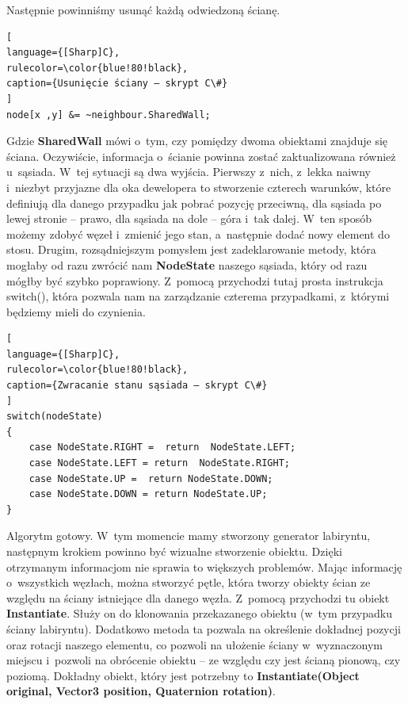 \documentclass[oneside,polski,logo]{amuthesis}
\begin{document}
Następnie powinniśmy usunąć każdą odwiedzoną ścianę.

\begin{lstlisting}[
language={[Sharp]C},
rulecolor=\color{blue!80!black},
caption={Usunięcie ściany – skrypt C\#}
]
node[x ,y] &= ~neighbour.SharedWall;
\end{lstlisting}

Gdzie \textbf{SharedWall} mówi o~tym, czy pomiędzy dwoma obiektami znajduje się ściana. Oczywiście, informacja o~ścianie powinna zostać zaktualizowana również u~sąsiada. W~tej sytuacji są dwa wyjścia. Pierwszy z~nich, z~lekka naiwny i~niezbyt przyjazne dla oka dewelopera to stworzenie czterech warunków, które definiują dla danego przypadku jak pobrać pozycję przeciwną, dla sąsiada po lewej stronie – prawo, dla sąsiada na dole – góra i~tak dalej. W~ten sposób możemy zdobyć węzeł i~zmienić jego stan, a~następnie dodać nowy element do stosu. Drugim, rozsądniejszym pomysłem jest zadeklarowanie metody, która mogłaby od razu zwrócić nam \textbf{NodeState} naszego sąsiada, który od razu mógłby być szybko poprawiony. Z~pomocą przychodzi tutaj prosta instrukcja switch(), która pozwala nam na zarządzanie czterema przypadkami, z~którymi będziemy mieli do czynienia.


\begin{lstlisting}[
language={[Sharp]C},
rulecolor=\color{blue!80!black},
caption={Zwracanie stanu sąsiada – skrypt C\#}
]
switch(nodeState)
{
	case NodeState.RIGHT =  return  NodeState.LEFT;
	case NodeState.LEFT = return  NodeState.RIGHT;
	case NodeState.UP =  return NodeState.DOWN;
	case NodeState.DOWN = return NodeState.UP;
}
\end{lstlisting}

Algorytm gotowy. W~tym momencie mamy stworzony generator labiryntu, następnym krokiem powinno być wizualne stworzenie obiektu. Dzięki otrzymanym informacjom nie sprawia to większych problemów. Mając informację o~wszystkich węzłach, można stworzyć pętle, która tworzy obiekty ścian ze względu na ściany istniejące dla danego węzła. Z~pomocą przychodzi tu obiekt \textbf{Instantiate}. Służy on do klonowania przekazanego obiektu (w~tym przypadku ściany labiryntu). Dodatkowo metoda ta pozwala na określenie dokładnej pozycji oraz rotacji naszego elementu, co pozwoli na ułożenie ściany w~wyznaczonym miejscu i~pozwoli na obrócenie obiektu – ze względu czy jest ścianą pionową, czy poziomą. Dokładny obiekt, który jest potrzebny to \textbf{Instantiate(Object original, Vector3 position, Quaternion rotation)}. \cite{Instantiate}
\end{document}
